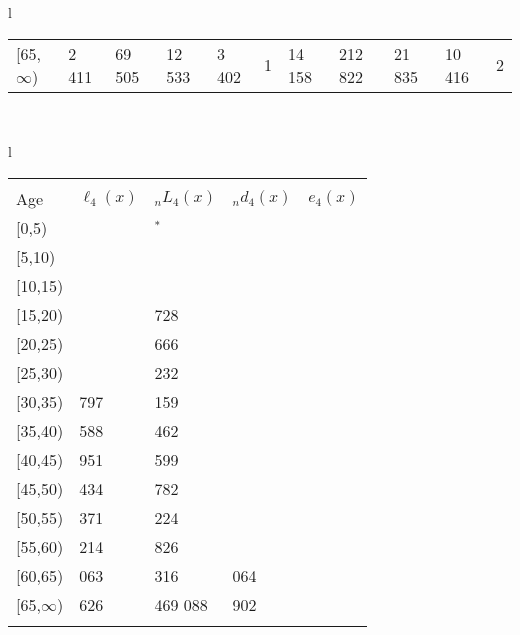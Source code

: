 \documentclass[
]{article}
\begin{document}
\begin{table}
\begin{tabular}[t]{l}
\begin{tabular}
{}[65,$\infty$) & 2 411 & 69 505 & 12 533 & 3 402 & 1 & 14 158 & 212 822 & 21 835 & 10 416 & 2\\
\end{tabular}\\
\end{tabular}
\centering
\begin{tabular}[t]{l}
\hline
\begin{tabular}{>{\raggedright\arraybackslash}p{.43in}>{\raggedleft\arraybackslash}p{1.3in}>{\raggedleft\arraybackslash}p{1.3in}>{\raggedleft\arraybackslash}p{1.3in}>{\raggedleft\arraybackslash}p{1.3in}}
\toprule
\multicolumn{1}{c}{ } & \multicolumn{4}{c}{(4) Lost both} \\
\cmidrule(l{3pt}r{3pt}){2-5}
Age & $\ell_{4}(x)$ & ${}_nL_{4}(x)$ & ${}_nd_{4}(x)$ & $e_{4}(x)$\\
\midrule
{}[0,5) & 0 & 128$^{*}$ & 0 & 22\\
{}[5,10) & 71 & 287 & 0 & 22\\
{}[10,15) & 71 & 602 & 0 & 22\\
{}[15,20) & 199 & 1 728 & 1 & 22\\
{}[20,25) & 515 & 3 666 & 2 & 22\\
\addlinespace
{}[25,30) & 957 & 7 232 & 4 & 22\\
{}[30,35) & 1 797 & 16 159 & 13 & 22\\
{}[35,40) & 3 588 & 27 462 & 27 & 22\\
{}[40,45) & 6 951 & 54 599 & 74 & 22\\
{}[45,50) & 11 434 & 81 782 & 179 & 22\\
\addlinespace
{}[50,55) & 16 371 & 128 224 & 434 & 21\\
{}[55,60) & 27 214 & 180 826 & 942 & 20\\
{}[60,65) & 38 063 & 249 316 & 2 064 & 19\\
{}[65,$\infty$) & 51 626 & 1 469 088 & 71 902 & 17\\
\bottomrule
\multicolumn{5}{l}{\rule{0pt}{1em}\textsuperscript{*} Based on an estimated from SIPP with less than 10 respondents in the numerator.}\\
\end{tabular}\\
\end{tabular}
\end{table}
\end{document}
